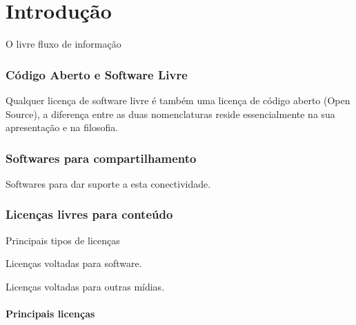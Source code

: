 \chapter{Introdução} %
\label{cap:intro} %

O livre fluxo de informação




\subsection{Código Aberto e Software Livre} %

Qualquer licença de software livre é também uma licença de código aberto (Open Source), a diferença entre as duas nomenclaturas reside essencialmente na sua apresentação e na filosofia.


\subsection{Softwares para compartilhamento} %
\label{sec:soft_compar} %

Softwares para dar suporte a esta conectividade.

\subsection{Licenças livres para conteúdo}
\label{sec:licencas_livres}

Principais tipos de licenças

Licenças voltadas para software.

Licenças voltadas para outras mídias.

\subsubsection{Principais licenças}
\label{sec:princ_licencas}

